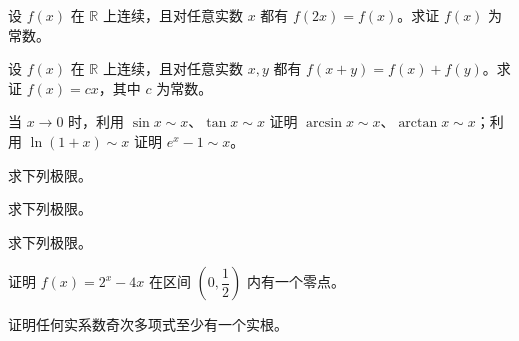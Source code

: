 \noindent\begin{minipage}{\textwidth}
设 $f(x)$ 在 $\mathbb R$ 上连续，且对任意实数 $x$ 都有 $f(2x)=f(x)$。求证 $f(x)$ 为常数。
\end{minipage}\par\vfill
\newpage
\noindent\begin{minipage}{\textwidth}
设 $f(x)$ 在 $\mathbb R$ 上连续，且对任意实数 $x,y$ 都有 $f(x+y)=f(x)+f(y)$。求证 $f(x)=cx$，其中 $c$ 为常数。
\end{minipage}\par\vfill
\noindent\begin{minipage}{\textwidth}
当 $x\to0$ 时，利用 $\sin x\sim x$、$\tan x\sim x$ 证明 $\arcsin x\sim x$、$\arctan x\sim x$；利用 $\ln(1+x)\sim x$ 证明 $e^x-1\sim x$。
\end{minipage}\par\vfill
\noindent\begin{minipage}{\textwidth}
求下列极限。
\end{minipage}\par\vfill
\noindent\begin{minipage}{\textwidth}
求下列极限。
\end{minipage}\par\vfill
\newpage
\noindent\begin{minipage}{\textwidth}
求下列极限。
\end{minipage}\par\vfill
\noindent\begin{minipage}{\textwidth}
证明 $f(x)=2^x-4x$ 在区间 $\left(0,\dfrac12\right)$ 内有一个零点。
\end{minipage}\par\vfill
\noindent\begin{minipage}{\textwidth}
证明任何实系数奇次多项式至少有一个实根。
\end{minipage}\par\vfill
